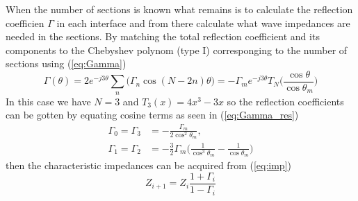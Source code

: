 \documentclass[12pt,a4paper]{article}
\begin{document}
When the number of sections is known what remains is to calculate the reflection coefficien $\Gamma$ in each interface and from there calculate what wave impedances are needed in the sections. By matching the total reflection coefficient and its components to the Chebyshev polynom (type I) corresponging to the number of sections using (\ref{eq:Gamma})
\begin{equation}
  \Gamma(\theta)=2e^{-j3\theta}\sum_n\big(\Gamma_n\cos(N-2n)\theta\big)=-\Gamma_me^{-j3\theta}T_N\Big(\frac{\cos\theta}{\cos\theta_m}\Big)
  \label{eq:Gamma}
\end{equation}
In this case we have $N=3$ and $T_3(x)=4x^3-3x$ so the reflection coefficients can be gotten by equating cosine terms as seen in (\ref{eq:Gamma_res})
\begin{subequations}
  \begin{align}
    \Gamma_0=\Gamma_3&=-\frac{\Gamma_m}{2\cos^{2}\theta_m}, \label{eq:Gamma_res1} \\
    \Gamma_1=\Gamma_2&=-\frac{3}{2}\Gamma_m\Big(\frac{1}{\cos^{3}\theta_m}-\frac{1}{\cos\theta_m}\Big)\label{eq:Gamma_res2}
  \end{align}
  \label{eq:Gamma_res}
\end{subequations}
then the characteristic impedances can be acquired from (\ref{eq:imp})
\begin{equation}
  Z_{i+1}=Z_i\frac{1+\Gamma_i}{1-\Gamma_i}
  \label{eq:imp}
\end{equation}
\end{document}
